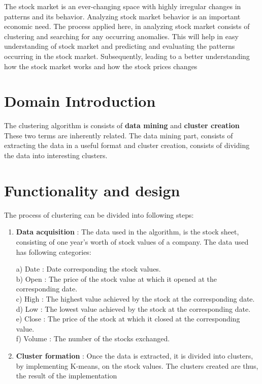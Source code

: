 \documentclass[12pt]{report}
\begin{document}
The stock market is an ever-changing space with highly irregular changes in patterns and its behavior. Analyzing stock market behavior is an important economic need. The process applied here,  in analyzing stock market consists of clustering and searching for any occurring anomalies. This will help in easy understanding of stock market and predicting  and evaluating the patterns occurring in the stock market. Subsequently, leading to a better understanding how the stock market works and how the stock prices changes


\section*{Domain Introduction}
The clustering algorithm is consists of \textbf{data mining} and \textbf{cluster creation} These two terms are inherently related. The data mining part, consists of extracting the data in a useful format and cluster creation, consists of dividing the data into interesting clusters.

\newpage
\section*{Functionality and design}

The process of clustering can be divided into following steps:
\begin{enumerate}
\item 
 \textbf{Data acquisition} :
    The data used in the algorithm, is the stock sheet, consisting of one year's worth of stock values of a company. The data used has following categories:

a) Date : Date corresponding the stock values.\\
b) Open : The price of the stock value at which it opened at the corresponding date.\\
c) High : The highest value achieved by the stock at the corresponding date.\\
d) Low  : The lowest value achieved by the stock at the corresponding date.\\
e) Close  : The price of the stock at which it closed at the corresponding value.\\
f) Volume : The number of the stocks exchanged.\\  
\item
\textbf{Cluster formation }:
     Once the data is extracted, it is divided into clusters, by implementing K-means, on the stock values. The clusters created are thus, the result of the implementation

\end{enumerate}
\end{document}
